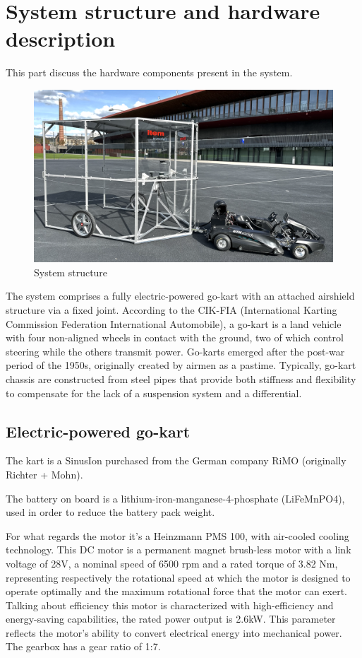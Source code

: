 \documentclass[a4paper,12pt,oneside]{book}
\begin{document}
\section{System structure and hardware description}
This part discuss the hardware components present in the system.
\begin{figure}
\centering
\includegraphics[scale=0.3]{Windshield.png}
\caption{System structure}
\end{figure}

The system comprises a fully electric-powered go-kart with an attached airshield structure via a fixed joint. According to the CIK-FIA (International Karting Commission Federation International Automobile), a go-kart is a land vehicle with four non-aligned wheels in contact with the ground, two of which control steering while the others transmit power. Go-karts emerged after the post-war period of the 1950s, originally created by airmen as a pastime. Typically, go-kart chassis are constructed from steel pipes that provide both stiffness and flexibility to compensate for the lack of a suspension system and a differential.

\subsection*{Electric-powered go-kart}
The kart is a SinusIon purchased from the German company RiMO (originally Richter + Mohn). 

\bigskip
The battery on board is a lithium-iron-manganese-4-phosphate (LiFeMnPO4), used in order to reduce the battery pack weight.

\bigskip
For what regards the motor it's a Heinzmann PMS 100, with air-cooled cooling technology. 
This DC motor is a permanent magnet brush-less motor with a link voltage of 28V, a nominal speed of 6500 rpm and a rated torque of 3.82 Nm, representing respectively the rotational speed at which the motor is designed to operate optimally and the maximum rotational force that the motor can exert.
Talking about efficiency this motor is characterized with high-efficiency and energy-saving capabilities, the rated power output is 2.6kW. 
This parameter reflects the motor's ability to convert electrical energy into mechanical power.
The gearbox has a gear ratio of 1:7.
\end{document}

